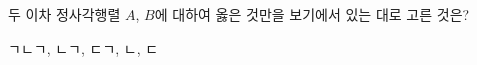 \hspace*{2mm}\begin{minipage}[t]{\dimexpr\linewidth-2mm\relax}\vspace{0pt}
두 이차 정사각행렬 $A$, $B$에 대하여 옳은 것만을 보기에서 있는 대로 고른 것은? 
\begin{choices32}{ㄱ}{ㄴ}{ㄱ, ㄴ}{ㄱ, ㄷ}{ㄱ, ㄴ, ㄷ}\end{choices32}\end{minipage}
